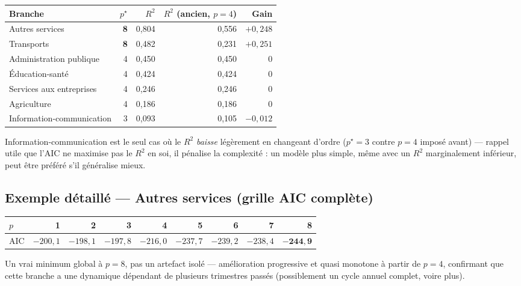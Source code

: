 \documentclass[11pt,a4paper]{article}
\begin{document}
\begin{center}
\small
\begin{tabular}{lrrrr}
\toprule
\textbf{Branche} & \textbf{$p^\star$} & \textbf{$R^2$} & \textbf{$R^2$ (ancien, $p=4$)} & \textbf{Gain} \\
\midrule
Autres services & \textbf{8} & 0,804 & 0,556 & $+0{,}248$ \\
Transports & \textbf{8} & 0,482 & 0,231 & $+0{,}251$ \\
Administration publique & 4 & 0,450 & 0,450 & $0$ \\
Éducation-santé & 4 & 0,424 & 0,424 & $0$ \\
Services aux entreprises & 4 & 0,246 & 0,246 & $0$ \\
Agriculture & 4 & 0,186 & 0,186 & $0$ \\
Information-communication & 3 & 0,093 & 0,105 & $-0{,}012$ \\
\bottomrule
\end{tabular}
\end{center}

\begin{intuition}
Information-communication est le seul cas où le $R^2$ \emph{baisse} légèrement en changeant d'ordre ($p^\star=3$ contre $p=4$ imposé avant) --- rappel utile que l'AIC ne maximise pas le $R^2$ en soi, il pénalise la complexité : un modèle plus simple, même avec un $R^2$ marginalement inférieur, peut être préféré s'il généralise mieux.
\end{intuition}

\subsection{Exemple détaillé --- Autres services (grille AIC complète)}

\begin{center}
\small
\begin{tabular}{lrrrrrrrr}
\toprule
$p$ & 1 & 2 & 3 & 4 & 5 & 6 & 7 & \textbf{8} \\
\midrule
AIC & $-200{,}1$ & $-198{,}1$ & $-197{,}8$ & $-216{,}0$ & $-237{,}7$ & $-239{,}2$ & $-238{,}4$ & $\mathbf{-244{,}9}$ \\
\bottomrule
\end{tabular}
\end{center}

\begin{intuition}
Un vrai minimum global à $p=8$, pas un artefact isolé --- amélioration progressive et quasi monotone à partir de $p=4$, confirmant que cette branche a une dynamique dépendant de plusieurs trimestres passés (possiblement un cycle annuel complet, voire plus).
\end{intuition}
\end{document}
